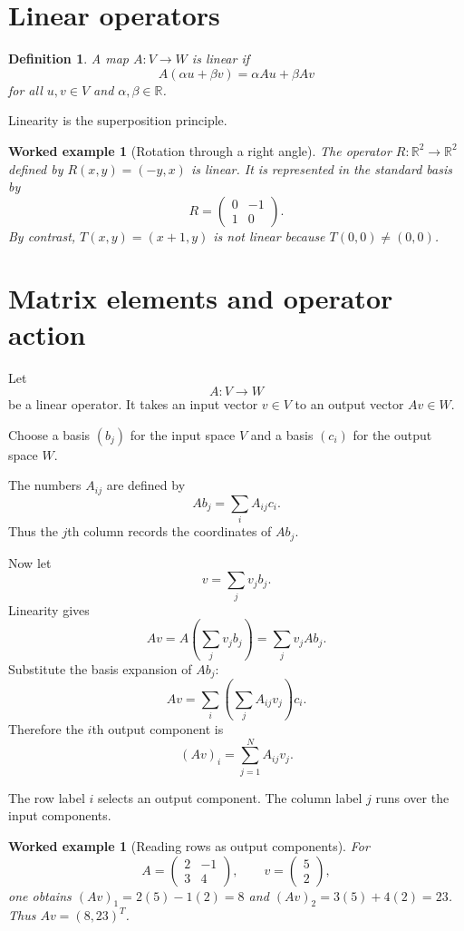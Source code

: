 \documentclass[11pt,a5paper,oneside,openany]{scrreprt}
\theoremstyle{notes}
\theoremstyle{definitions}
\newtheorem{definition}[theorem]{Definition}
\newtheorem{example}[theorem]{Worked example}
\newcommand{\R}{\mathbb{R}}
\begin{document}
\section{Linear operators}

\begin{definition}
A map $A:V\to W$ is linear if
\[
  A(\alpha u+\beta v)=\alpha Au+\beta Av
\]
for all $u,v\in V$ and $\alpha,\beta\in\R$.
\end{definition}

Linearity is the superposition principle.

\begin{example}[Rotation through a right angle]
The operator $R:\R^2\to\R^2$ defined by $R(x,y)=(-y,x)$ is linear.  It is
represented in the standard basis by
\[
 R=\begin{pmatrix}0&-1\\1&0\end{pmatrix}.
\]
By contrast, $T(x,y)=(x+1,y)$ is not linear because $T(0,0)\ne(0,0)$.
\end{example}

\section{Matrix elements and operator action}

Let
\[
  A:V\longrightarrow W
\]
be a linear operator.  It takes an input vector $v\in V$ to an output vector
$Av\in W$.

Choose a basis $(b_j)$ for the input space $V$ and a basis $(c_i)$ for the
output space $W$.

The numbers $A_{ij}$ are defined by
\[
  \boxed{Ab_j=\sum_i A_{ij}c_i}.
\]
Thus the $j$th column records the coordinates of $Ab_j$.

Now let
\[
  v=\sum_jv_jb_j.
\]
Linearity gives
\[
  Av=A\left(\sum_jv_jb_j\right)
  =\sum_jv_jAb_j.
\]
Substitute the basis expansion of $Ab_j$:
\[
  Av=\sum_i\left(\sum_j A_{ij}v_j\right)c_i.
\]
Therefore the $i$th output component is
\[
  \boxed{(Av)_i=\sum_{j=1}^{N}A_{ij}v_j}.
\]

The row label $i$ selects an output component.  The column label $j$ runs over
the input components.

\begin{example}[Reading rows as output components]
For
\[
 A=\begin{pmatrix}2&-1\\3&4\end{pmatrix},
 \qquad v=\begin{pmatrix}5\\2\end{pmatrix},
\]
one obtains $(Av)_1=2(5)-1(2)=8$ and
$(Av)_2=3(5)+4(2)=23$.  Thus $Av=(8,23)^T$.
\end{example}
\end{document}

